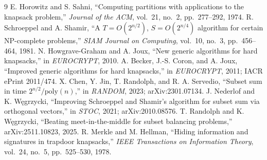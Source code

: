 \documentclass[conference]{IEEEtran}
\begin{document}
\begin{thebibliography}{9}
 E. Horowitz and S. Sahni, ``Computing partitions with applications
to the knapsack problem,'' \emph{Journal of the ACM}, vol.~21, no.~2,
pp.~277--292, 1974.
 R. Schroeppel and A. Shamir, ``A $T=O(2^{n/2})$, $S=O(2^{n/4})$
algorithm for certain NP-complete problems,'' \emph{SIAM Journal on Computing},
vol.~10, no.~3, pp.~456--464, 1981.
 N. Howgrave-Graham and A. Joux, ``New generic algorithms for hard
knapsacks,'' in \emph{EUROCRYPT}, 2010.
 A. Becker, J.-S. Coron, and A. Joux, ``Improved generic algorithms
for hard knapsacks,'' in \emph{EUROCRYPT}, 2011; IACR ePrint 2011/474.
 X. Chen, Y. Jin, T. Randolph, and R. A. Servedio, ``Subset sum
in time $2^{n/2}/\mathrm{poly}(n)$,'' in \emph{RANDOM}, 2023; arXiv:2301.07134.
 J. Nederlof and K. W\k{e}grzycki, ``Improving Schroeppel and
Shamir's algorithm for subset sum via orthogonal vectors,'' in \emph{STOC},
2021; arXiv:2010.08576.
 T. Randolph and K. W\k{e}grzycki, ``Beating meet-in-the-middle for
subset balancing problems,'' arXiv:2511.10823, 2025.
 R. Merkle and M. Hellman, ``Hiding information and signatures in
trapdoor knapsacks,'' \emph{IEEE Transactions on Information Theory}, vol.~24,
no.~5, pp.~525--530, 1978.
\end{thebibliography}
\end{document}
